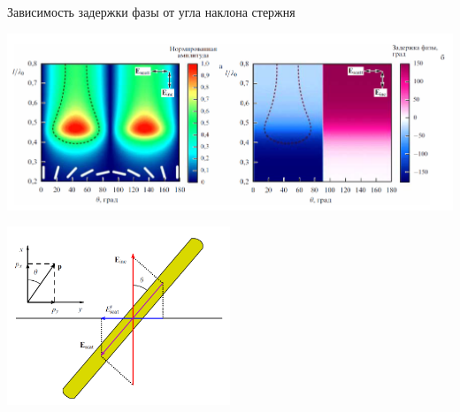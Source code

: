 \documentclass[9pt, compress, xcolor=table]{beamer}
\begin{document}
\begin{frame}{Зависимость задержки фазы от угла наклона стержня}
\begin{center}
\includegraphics[width=\textwidth]{images/nanorod1.png}

\includegraphics[width=0.5\textwidth]{images/nanorod.png}
\end{center}
\end{frame}
\end{document}
